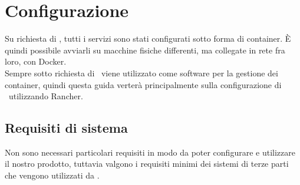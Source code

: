 \section{Configurazione}\label{configurazione}

Su richiesta di \II, tutti i servizi sono stati configurati sotto forma di container. È quindi possibile avviarli su macchine fisiche differenti, ma collegate in rete fra loro, con Docker.\\
Sempre sotto richiesta di \II\ viene utilizzato  come software per la gestione dei container, quindi questa guida verterà principalmente sulla configurazione di \progetto\ utilizzando Rancher. %

\subsection{Requisiti di sistema}

	Non sono necessari particolari requisiti in modo da poter configurare e utilizzare il nostro prodotto, tuttavia valgono i requisiti minimi dei sistemi di terze parti che vengono utilizzati da \progetto.

